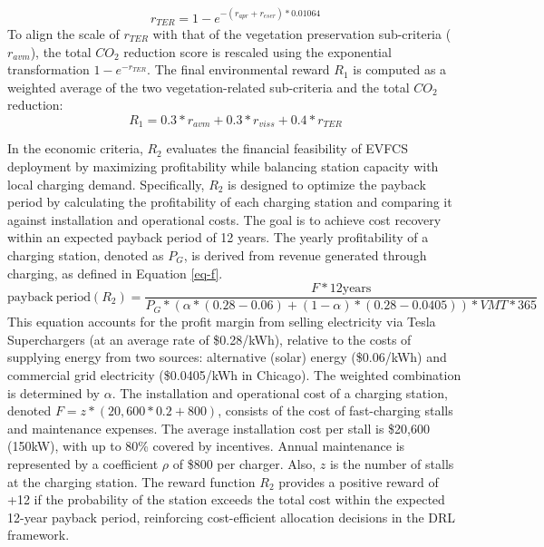 \documentclass[preprint,12pt]{elsarticle}
\begin{document}
\begin{equation} \label{eq-e}
    r_{TER} = 1-e^{-(r_{apr}+r_{eser})*0.01064}
\end{equation}
To align the scale of $r_{TER}$ with that of the vegetation preservation sub-criteria ($r_{avm}$), the total $CO_2$ reduction score is rescaled using the exponential transformation $1-e^{-r_{TER}}$. The final environmental reward $R_1$ is computed as a weighted average of the two vegetation-related sub-criteria and the total $CO_2$ reduction:
\begin{equation} \label{eq-a}
    R_1=0.3*r_{avm}+0.3*r_{viss}+0.4*r_{TER}
\end{equation}

In the economic criteria, $R_2$ evaluates the financial feasibility of EVFCS deployment by maximizing profitability while balancing station capacity with local charging demand. Specifically, $R_2$ is designed to optimize the payback period by calculating the profitability of each charging station and comparing it against installation and operational costs. The goal is to achieve cost recovery within an expected payback period of 12 years. The yearly profitability of a charging station, denoted as $P_G$, is derived from revenue generated through charging, as defined in Equation \eqref{eq-f}.
\begin{equation} \label{eq-f}
   \mathrm{payback \: period} (R_2)= \frac{F *12 \mathrm{years}}{ P_G*(\alpha*(0.28-0.06) + (1-\alpha)*(0.28-0.0405)) * VMT * 365}
\end{equation}
This equation accounts for the profit margin from selling electricity via Tesla Superchargers (at an average rate of \$0.28/kWh), relative to the costs of supplying energy from two sources: alternative (solar) energy (\$0.06/kWh) and commercial grid electricity (\$0.0405/kWh in Chicago). The weighted combination is determined by $\alpha$. The installation and operational cost of a charging station, denoted $F = z *(20,600*0.2+800)$, consists of the cost of fast-charging stalls and maintenance expenses. The average installation cost per stall is \$20,600 (150kW), with up to 80\% covered by incentives. Annual maintenance is represented by a coefficient $\rho$ of \$800 per charger. Also, $z$ is the number of stalls at the charging station. The reward function $R_2$ provides a positive reward of +12 if the probability of the station exceeds the total cost within the expected 12-year payback period, reinforcing cost-efficient allocation decisions in the DRL framework. 
\end{document}
